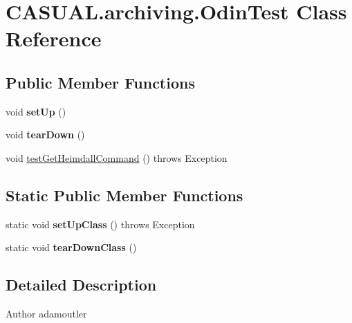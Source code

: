 \hypertarget{classCASUAL_1_1archiving_1_1OdinTest}{\section{C\-A\-S\-U\-A\-L.\-archiving.\-Odin\-Test Class Reference}
\label{classCASUAL_1_1archiving_1_1OdinTest}
}
\subsection*{Public Member Functions}
\begin{DoxyCompactItemize}
\item 
\hypertarget{classCASUAL_1_1archiving_1_1OdinTest_ad34fd1644e8066e376256efffe658484}{void {\bfseries set\-Up} ()}\label{classCASUAL_1_1archiving_1_1OdinTest_ad34fd1644e8066e376256efffe658484}

\item 
\hypertarget{classCASUAL_1_1archiving_1_1OdinTest_ac64874c4e16ed83cd449fd60920d39ad}{void {\bfseries tear\-Down} ()}\label{classCASUAL_1_1archiving_1_1OdinTest_ac64874c4e16ed83cd449fd60920d39ad}

\item 
void \hyperlink{classCASUAL_1_1archiving_1_1OdinTest_aedccee3742d364c32e152b316a5502cd}{test\-Get\-Heimdall\-Command} ()  throws Exception 
\end{DoxyCompactItemize}
\subsection*{Static Public Member Functions}
\begin{DoxyCompactItemize}
\item 
\hypertarget{classCASUAL_1_1archiving_1_1OdinTest_a8cd2b267a73851fb26aaca8173f52abd}{static void {\bfseries set\-Up\-Class} ()  throws Exception }\label{classCASUAL_1_1archiving_1_1OdinTest_a8cd2b267a73851fb26aaca8173f52abd}

\item 
\hypertarget{classCASUAL_1_1archiving_1_1OdinTest_a5b896696c51151707e62c81cf650f32e}{static void {\bfseries tear\-Down\-Class} ()}\label{classCASUAL_1_1archiving_1_1OdinTest_a5b896696c51151707e62c81cf650f32e}

\end{DoxyCompactItemize}


\subsection{Detailed Description}
\begin{DoxyAuthor}{Author}
adamoutler 
\end{DoxyAuthor}


